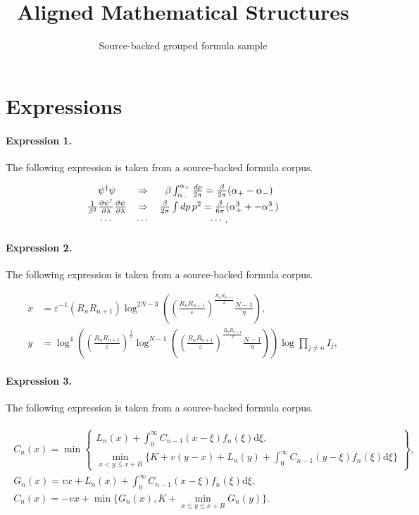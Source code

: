 \documentclass[11pt]{article}
\title{Aligned Mathematical Structures}
\author{Source-backed grouped formula sample}
\date{}
\begin{document}
\maketitle
\section{Expressions}
\paragraph{Expression 1.} The following expression is taken from a source-backed formula corpus.

\begin{align*}\begin{array}{ccc}\psi^{\dagger} \psi& \Rightarrow & \beta\int_{\alpha_-}^{\alpha_+}{dp \over2\pi}={\beta\over 2\pi}(\alpha_+-\alpha_-) \\{1\over \beta^2}{\partial \psi^{\dagger} \over \partial \lambda}{\partial \psi \over \partial \lambda} &\Rightarrow &{\beta\over 2\pi}\int dp \, p^2={\beta \over 6\pi}(\alpha_+^3 +-\alpha_-^3) \\\cdots & \cdots & \cdots .\end{array}\end{align*}

\paragraph{Expression 2.} The following expression is taken from a source-backed formula corpus.

\begin{align*}x&=\varepsilon^{-1} (R_{n}R_{n+1}) \log^{2N-3}\left(\left(\frac{R_{n}R_{n+1}}{\varepsilon}\right)^{\frac{R_{n}R_{n+1}}{2}} \frac{N-1}{\eta}\right),\\y&=\log^4\left(\left(\frac{R_{n}R_{n+1}}{\varepsilon}\right)^{\frac{1}{2}} \log^{N-1}\left( \left(\frac{R_{n}R_{n+1}}{\varepsilon}\right)^{\frac{R_{n}R_{n+1}}{2}} \frac{N-1}{\eta} \right) \right) \log \prod_{j \ne n} I_j,\end{align*}

\paragraph{Expression 3.} The following expression is taken from a source-backed formula corpus.

\begin{align*}\begin{array}{l}C_n(x)=\min\left\{\begin{array}{l}L_n(x)+\int_0^\infty C_{n-1}(x-\xi)f_n(\xi) \mathrm{d}\xi,\\\min_{x< y \leq x+B} \{K+v(y-x)+L_n(y)+\int_0^\infty C_{n-1}(y-\xi)f_n(\xi) \mathrm{d}\xi\}\end{array}\right\},\\G_n(x)=vx + L_n(x)+\int_0^\infty C_{n-1}(x-\xi)f_n(\xi) \mathrm{d}\xi,\\C_n(x)=-vx + \min\{G_n(x),K + \min_{x\leq y \leq x+B} G_n(y)\}.\end{array}\end{align*}
\end{document}
